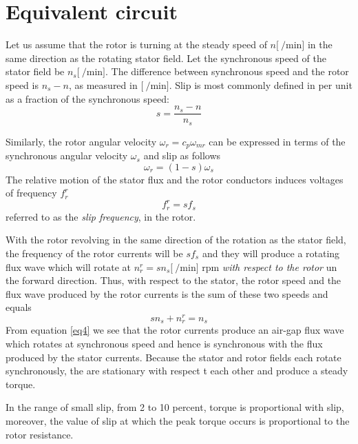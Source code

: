 \documentclass[11pt,a4paper,oneside]{book}
\numberwithin{equation}{section}
\theoremstyle{it}
\theoremstyle{definition}
\begin{document}
\section{Equivalent circuit}
Let us assume that the rotor is turning at the steady speed of $n\Big[\SI{}{\per\minute}\Big]$ in the same direction as the rotating stator field. Let the synchronous speed of the stator field be $n_s\Big[\SI{}{\per\minute}\Big]$. The difference between synchronous speed and the rotor speed is $n_s-n$, as measured in $\Big[\SI{}{\per\minute}\Big]$. Slip is most commonly defined in per unit as a fraction of the synchronous speed:
\begin{equation} \label{eq1}
	s=\frac{n_s - n}{n_s}
\end{equation}

Similarly, the rotor angular velocity $\omega_r=c_p\omega_{mr}$ can be expressed in terms of the synchronous angular velocity $\omega_s$ and slip as follows
\begin{equation} \label{eq2}
	\omega_r=(1-s)\omega_s
\end{equation}
The relative motion of the stator flux and the rotor conductors induces voltages of frequency $f_r^r$
\begin{equation} \label{eq3}
	f_r^r=sf_s
\end{equation}
referred to as the \textit{slip frequency}, in the rotor.

With the rotor revolving in the same direction of the rotation as the stator field, the frequency of the rotor currents will be $sf_s$ and they will produce a rotating flux wave which will rotate at $n_r^r=sn_s\Big[\SI{}{\per\minute}\Big]$ rpm \textit{with respect to the rotor} un the forward direction. Thus, with respect to the stator, the rotor speed and the flux wave produced by the rotor currents is the sum of these two speeds and equals
\begin{equation} \label{eq4}
	s n_s + n_r^r = n_s
\end{equation}
From equation \ref{eq4} we see that the rotor currents produce an air-gap flux wave which rotates at synchronous speed and hence is synchronous with the flux produced by the stator currents. Because the stator and rotor fields each rotate synchronously, the are stationary with respect t each other and produce a steady torque.

In the range of small slip, from 2 to 10 percent, torque is proportional with slip, moreover, the value of slip at which the peak torque occurs is proportional to the rotor resistance.
\end{document}
